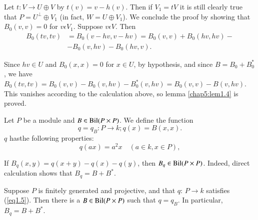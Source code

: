 Let $t: V \to U \oplus V$ by $t(v) = v-h(v)$. Then if $V_1 = tV$ it
is still clearly true that $P = U^\perp \oplus V_1$ (in fact, $W = U
\oplus V_1$). We conclude the proof by showing that $B_0(v, v)=0$ for
$v \epsilon V_1$. 
Suppose $v \epsilon V$. Then 
\begin{align*}
B_0 (tv, tv) & = B_0(v-hv, v-hv) = B_0(v,
v) + B_0(hv, hv)-\\
& - B_0 (v, hv) - B_0 (hv, v). 
\end{align*}

Since $hv \in U$ and $B_0 (x, x) = 0$ for $x \in U$, by hypothesis,
and since $B= B_0 + B^\ast_0$, we have $B_0(tv, tv)=B_0 (v, v) - B_0(v,
hv)- B^\ast_0 (v, hv)= B_0 (v, v) - B(v, hv)$. This vanishes
according to the calculation above, so lemma \ref{chap5:lem1.4} is proved. 

Let $P$ be a module and $B \in \operatorname{Bil} (P \times P)$. We define the
function 
$$
q = q_B : P \to k; q(x) = B(x, x).
$$
$q$ has\pageoriginale the following properties:
\begin{equation*}
q(ax) = a^2 x  \quad (a \in k, x \in P), \tag{1.5}\label{eq1.5}
\end{equation*}

If $B_q(x, y) = q(x+y) - q(x) -q(y)$, then $B_q \in \operatorname{Bil} (P \times
P)$. Indeed, direct calculation shows that $B_q = B+B^*$. 

\setcounter{lemma}{5}
\begin{lemma}%
 Suppose $P$ is finitely generated and projective, and that $q$: $P
 \to k$ satisfies (\ref{eq1.5}). Then there is a $B \in \operatorname{Bil} (P \times P)$
 such that $q =q_B$. In particular, $B_q = B+B^*$. 
\end{lemma}

